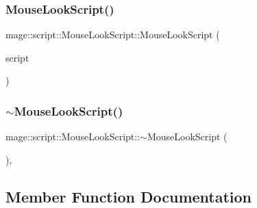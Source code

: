 \hypertarget{classmage_1_1script_1_1_mouse_look_script_a73a93dbad87071681ecd896c7429fefa}{}\label{classmage_1_1script_1_1_mouse_look_script_a73a93dbad87071681ecd896c7429fefa} 
\subsubsection{\texorpdfstring{Mouse\+Look\+Script()}{MouseLookScript()}\hspace{0.1cm}{\footnotesize\ttfamily [3/3]}}
{\footnotesize\ttfamily mage\+::script\+::\+Mouse\+Look\+Script\+::\+Mouse\+Look\+Script (\begin{DoxyParamCaption}\item[{\hyperlink{classmage_1_1script_1_1_mouse_look_script}{Mouse\+Look\+Script} \&\&}]{script }\end{DoxyParamCaption})\hspace{0.3cm}{\ttfamily [default]}}

\hypertarget{classmage_1_1script_1_1_mouse_look_script_a29a6d2cb4742fbf745822d015e72484f}{}\label{classmage_1_1script_1_1_mouse_look_script_a29a6d2cb4742fbf745822d015e72484f} 
\subsubsection{\texorpdfstring{$\sim$\+Mouse\+Look\+Script()}{~MouseLookScript()}}
{\footnotesize\ttfamily mage\+::script\+::\+Mouse\+Look\+Script\+::$\sim$\+Mouse\+Look\+Script (\begin{DoxyParamCaption}{ }\end{DoxyParamCaption})\hspace{0.3cm}{\ttfamily [virtual]}, {\ttfamily [default]}}



\subsection{Member Function Documentation}
\hypertarget{classmage_1_1script_1_1_mouse_look_script_afa39a7adab4c979ef6d78304f37a231f}{}\label{classmage_1_1script_1_1_mouse_look_script_afa39a7adab4c979ef6d78304f37a231f} 
